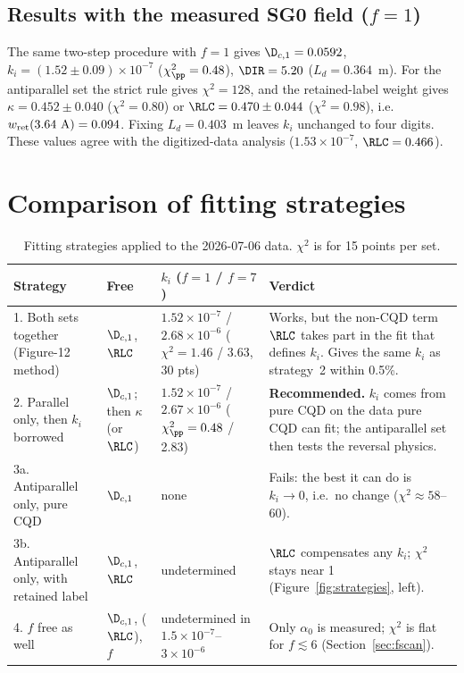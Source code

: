 \subsection{Results with the measured SG0 field (\texorpdfstring{$f=1$}{f=1})}
The same two-step procedure with $f=1$ gives $\D_{c,1}=0.0592$, $k_i=(1.52\pm0.09)\times10^{-7}$
($\chi^2_\pp=0.48$), $\DIR=5.20$ ($L_d=0.364$~m). For the antiparallel set the strict rule gives
$\chi^2=128$, and the retained-label weight gives $\kappa=0.452\pm0.040$ ($\chi^2=0.80$) or
$\RLC=0.470\pm0.044$ ($\chi^2=0.98$), i.e.\ $w_{\rm ret}(3.64~\text{A})=0.094$. Fixing $L_d=0.403$~m
leaves $k_i$ unchanged to four digits. These values agree with the digitized-data analysis
($1.53\times10^{-7}$, $\RLC=0.466$).

\section{Comparison of fitting strategies}
\label{sec:strategies}

\begin{table}[h]
\centering
\caption{Fitting strategies applied to the 2026-07-06 data. $\chi^2$ is for 15 points per set.}
\label{tab:strategies}
\footnotesize\setlength{\tabcolsep}{4pt}
\begin{tabular}{p{3.5cm}p{2.0cm}p{3.6cm}p{5.2cm}}
\toprule
Strategy & Free & $k_i$ ($f=1$ / $f=7$) & Verdict\\
\midrule
1. Both sets together (Figure-12 method) & $\D_{c,1}$, $\RLC$ & $1.52\times10^{-7}$ / $2.68\times10^{-6}$ ($\chi^2=1.46$ / 3.63, 30 pts) &
Works, but the non-CQD term $\RLC$ takes part in the fit that defines $k_i$. Gives the same $k_i$ as
strategy~2 within 0.5\%.\\[3pt]
2. Parallel only, then $k_i$ borrowed & $\D_{c,1}$; then $\kappa$ (or $\RLC$) & $1.52\times10^{-7}$ / $2.67\times10^{-6}$ ($\chi^2_\pp=0.48$ / 2.83) &
\textbf{Recommended.} $k_i$ comes from pure CQD on the data pure CQD can fit; the antiparallel set
then tests the reversal physics.\\[3pt]
3a. Antiparallel only, pure CQD & $\D_{c,1}$ & none &
Fails: the best it can do is $k_i\to0$, i.e.\ no change ($\chi^2\approx58$--60).\\[3pt]
3b. Antiparallel only, with retained label & $\D_{c,1}$, $\RLC$ & undetermined &
$\RLC$ compensates any $k_i$; $\chi^2$ stays near 1 (Figure~\ref{fig:strategies}, left).\\[3pt]
4. $f$ free as well & $\D_{c,1}$, ($\RLC$), $f$ & undetermined in $1.5\times10^{-7}$--$3\times10^{-6}$ &
Only $\alpha_0$ is measured; $\chi^2$ is flat for $f\lesssim6$ (Section~\ref{sec:fscan}).\\
\bottomrule
\end{tabular}
\end{table}

